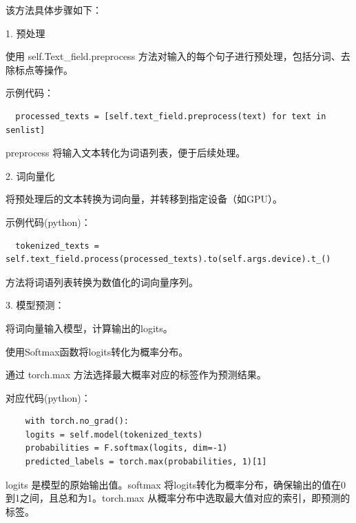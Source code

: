 \documentclass[UTF8,a4paper,15pt,titlepage,oneside]{ctexbook}
\begin{document}
该方法具体步骤如下：

1. 预处理

使用 self.Text\_field.preprocess 方法对输入的每个句子进行预处理，包括分词、去除标点等操作。

示例代码：

\begin{mdframed}[backgroundcolor=darkgray, linecolor=lightgray, linewidth=1pt, innermargin=0.5cm, outermargin=0.5cm, skipbelow=0.1cm]
  \color{white}
  \begin{verbatim}
  processed_texts = [self.text_field.preprocess(text) for text in senlist]
\end{verbatim}  
\end{mdframed}

preprocess 将输入文本转化为词语列表，便于后续处理。

2. 词向量化

将预处理后的文本转换为词向量，并转移到指定设备（如GPU）。

示例代码(python)：

\begin{mdframed}[backgroundcolor=darkgray, linecolor=lightgray, linewidth=1pt, innermargin=0.5cm, outermargin=0.5cm, skipbelow=0.1cm]
  \color{white}
  \begin{verbatim}
  tokenized_texts = self.text_field.process(processed_texts).to(self.args.device).t_()
\end{verbatim}  
\end{mdframed}

方法将词语列表转换为数值化的词向量序列。

3.	模型预测：

将词向量输入模型，计算输出的logits。

使用Softmax函数将logits转化为概率分布。

通过 torch.max 方法选择最大概率对应的标签作为预测结果。

对应代码(python)：

\begin{mdframed}[backgroundcolor=darkgray, linecolor=lightgray, linewidth=1pt, innermargin=0.5cm, outermargin=0.5cm, skipbelow=0.1cm]
  \color{white}
  \begin{verbatim}
    with torch.no_grad():
    logits = self.model(tokenized_texts)
    probabilities = F.softmax(logits, dim=-1)
    predicted_labels = torch.max(probabilities, 1)[1]
\end{verbatim}  
\end{mdframed}

logits 是模型的原始输出值。softmax 将logits转化为概率分布，确保输出的值在0到1之间，且总和为1。torch.max 从概率分布中选取最大值对应的索引，即预测的标签。
\end{document}
